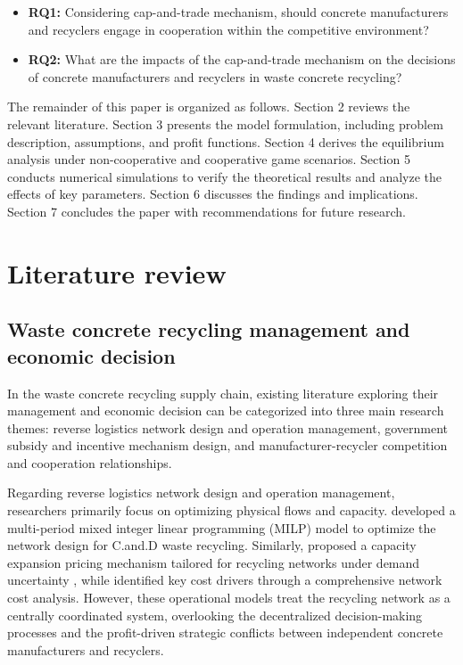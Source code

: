\documentclass[authoryear,preprint,review,times,10pt]{elsarticle}
\begin{document}
\begin{itemize}
\item \textbf{RQ1:} Considering cap-and-trade mechanism, should concrete manufacturers and recyclers engage in cooperation within the competitive environment?
\item \textbf{RQ2:} What are the impacts of the cap-and-trade mechanism on the decisions of concrete manufacturers and recyclers in waste concrete recycling?
\end{itemize}

The remainder of this paper is organized as follows. Section 2 reviews the relevant literature. Section 3 presents the model formulation, including problem description, assumptions, and profit functions. Section 4 derives the equilibrium analysis under non-cooperative and cooperative game scenarios. Section 5 conducts numerical simulations to verify the theoretical results and analyze the effects of key parameters. Section 6 discusses the findings and implications. Section 7 concludes the paper with recommendations for future research.

\section{Literature review}
\subsection{Waste concrete recycling management and economic decision}
In the waste concrete recycling supply chain, existing literature exploring their management and economic decision can be categorized into three main research themes: reverse logistics network design and operation management, government subsidy and incentive mechanism design, and manufacturer-recycler competition and cooperation relationships.

Regarding reverse logistics network design and operation management, researchers primarily focus on optimizing physical flows and capacity. \cite{rahimi2018Sustainable} developed a multi-period mixed integer linear programming (MILP) model to optimize the network design for C.and.D waste recycling. Similarly, \cite{xu2019Reverse} proposed a capacity expansion pricing mechanism tailored for recycling networks under demand uncertainty , while \cite{liu2019Expand} identified key cost drivers through a comprehensive network cost analysis. However, these operational models treat the recycling network as a centrally coordinated system, overlooking the decentralized decision-making processes and the profit-driven strategic conflicts between independent concrete manufacturers and recyclers.
\end{document}
